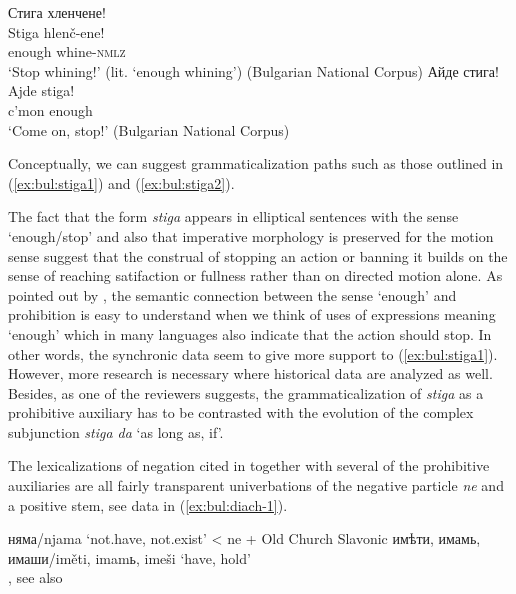 \documentclass[output=paper,colorlinks=true, citecolor=brown]{langscibook}
\begin{document}
\ea\label{ex:bul:stiga-stop}
    \ea Стига хленчене!\\ \label{ex:bul:stiga-stop-whining} 
        \gll Stiga hlenč-ene!\\
            enough whine-\textsc{nmlz}\\
        \glt `Stop whining!' (lit. `enough whining') (Bulgarian National Corpus)
        \ex Айде стига!\\ \label{ex:bul:stiga-stop-prosentence}
        \gll Ajde stiga!\\
            c'mon enough\\
        \glt `Come on, stop!' (Bulgarian National Corpus)
    \z 
\z


Conceptually, we can suggest grammaticalization paths such as those outlined in (\ref{ex:bul:stiga1}) and (\ref{ex:bul:stiga2}).


The fact that the form \textit{stiga} appears in elliptical sentences with the sense `enough\slash stop' and also that imperative morphology is preserved for the motion sense suggest that the construal of stopping an action or banning it builds on the sense of reaching satifaction or fullness rather than on directed motion alone. As pointed out by \citet{Auwera2006}, the semantic connection between the sense `enough' and prohibition is easy to understand when we think of uses of expressions meaning `enough' which in many languages also indicate that the action should stop. In other words, the synchronic data seem to give more support to (\ref{ex:bul:stiga1}). However, more research is necessary where historical data are analyzed as well. Besides, as one of the reviewers suggests, the grammaticalization of \textit{stiga} as a prohibitive auxiliary has to be contrasted with the evolution of the complex subjunction \textit{stiga da} `as long as, if'.

The lexicalizations of negation cited in  together with several of the prohibitive auxiliaries are all fairly transparent univerbations of the negative particle \textit{ne} and a positive stem, see data  in (\ref{ex:bul:diach-1}).

\ea \label{ex:bul:diach-1}
    \ea няма/njama  `not.have, not.exist' < ne + Old Church Slavonic имѣти, имамь, имаши/iměti, imamь, imeši `have, hold'\\ \label{ex:bul:diach-1a} \href{https://ibl.bas.bg/lib/ber_4_000-1004/#page/732/mode/1up}{\citet[v.4:732]{GeorgievIlčev1971}}, see also \citealt{OldChurchSlavonicOnline2020}
      	
\end{document}
